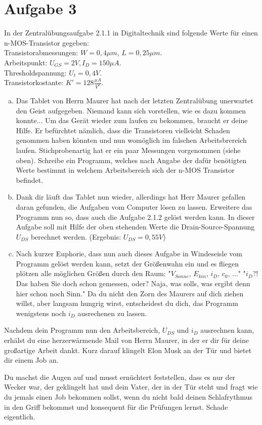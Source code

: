 \documentclass{standalone}
\begin{document}
\section{Aufgabe 3}
    In der Zentralübungsaufgabe 2.1.1 in Digitaltechnik sind folgende Werte für einen 
    n-MOS-Transistor gegeben: \\
    Transistorabmessungen: $W = 0,4\mu m$, $L = 0,25\mu m$.\\
    Arbeitspunkt: $U_{GS} = 2V, I_D = 150\mu A$.\\
    Thresholdspannung: $U_t = 0,4V$.\\
    Transistorkostante: $K' = 128 \frac{\mu A}{V^2}$.

\begin{enumerate}[a)]
\item
    Das Tablet von Herrn Maurer hat nach der letzten Zentralübung unerwartet den Geist aufgegeben. Niemand
    kann sich vorstellen, wie es dazu kommen konnte...  Um das Gerät wieder zum laufen zu bekommen, braucht er deine Hilfe. 
    Er befürchtet nämlich, dass die Transistoren vielleicht Schaden genommen haben könnten und nun womöglich im falschen Arbeitsbrereich laufen.
    Stichprobenartig hat er ein paar Messungen vorgenommen (siehe oben). Schreibe ein Programm, welches nach Angabe der dafür benötigten 
    Werte bestimmt in welchem Arbeitsbereich sich der n-MOS Transistor befindet. 
    
\item 
    Dank dir läuft das Tablet nun wieder, allerdings hat Herr Maurer gefallen daran gefunden, die Aufgaben vom Computer lösen zu lassen.
    Erweitere das Programm nun so, dass auch die Aufgabe 2.1.2 gelöst werden kann. In dieser Aufgabe soll mit Hilfe der oben stehenden Werte
    die Drain-Source-Spannung $U_{DS}$ berechnet werden. (Ergebnis: $U_{DS} = 0,55V$)

\item
    Nach kurzer Euphorie, dass nun auch dieses Aufgabe in Windeseisle vom Programm gelöst werden kann, setzt der Größenwahn ein und es fliegen
    plötzen alle möglichen Größen durch den Raum:
    "$V_{Sonne}$, $E_{kin}$, $i_D$, $c_0$, ..."
    "$i_D$?! Das haben Sie doch schon gemessen, oder? Naja, was solls, was ergibt denn hier schon noch Sinn."
    Da du nicht den Zorn des Maurers auf dich ziehen willst, aber langsam hungrig wirst, entscheidest du dich, das Programm 
    wenigstens noch $i_D$ ausrechenen zu lassen.  
\end{enumerate}

Nachdem dein Programm nun den Arbeitsbereich, $U_{DS}$ und $i_D$ ausrechnen kann, erhälst du eine herzerwärmende Mail von Herrn Maurer, in der er dir 
für deine großartige Arbeit dankt. Kurz darauf klingelt Elon Musk an der Tür und bietet dir einem Job an.

Du machst die Augen auf und musst ernüchtert feststellen, dass es nur der Wecker war, der geklingelt hat und dein Vater, der in der Tür steht und fragt wie du 
jemals einen Job bekommen sollst, wenn du nicht bald deinen Schlafrythmus in den Griff bekommst und konsequent für die Prüfungen lernst.
Schade eigentlich.
\end{document}
